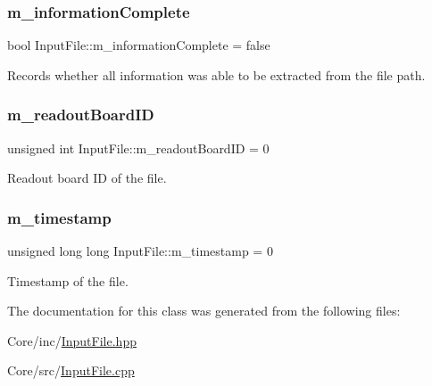 \subsubsection{\texorpdfstring{m\+\_\+information\+Complete}{m\_informationComplete}}
{\footnotesize\ttfamily bool Input\+File\+::m\+\_\+information\+Complete = false\hspace{0.3cm}{\ttfamily [private]}}



Records whether all information was able to be extracted from the file path. 

\mbox{\label{class_input_file_a15431dd487c5ac563745856544c9261d}} 
\subsubsection{\texorpdfstring{m\+\_\+readout\+Board\+ID}{m\_readoutBoardID}}
{\footnotesize\ttfamily unsigned int Input\+File\+::m\+\_\+readout\+Board\+ID = 0\hspace{0.3cm}{\ttfamily [private]}}



Readout board ID of the file. 

\mbox{\label{class_input_file_a900aea752727f969fa00a8b2727dd4e8}} 
\subsubsection{\texorpdfstring{m\+\_\+timestamp}{m\_timestamp}}
{\footnotesize\ttfamily unsigned long long Input\+File\+::m\+\_\+timestamp = 0\hspace{0.3cm}{\ttfamily [private]}}



Timestamp of the file. 



The documentation for this class was generated from the following files\+:\begin{DoxyCompactItemize}
\item 
Core/inc/\hyperlink{_input_file_8hpp}{Input\+File.\+hpp}\item 
Core/src/\hyperlink{_input_file_8cpp}{Input\+File.\+cpp}\end{DoxyCompactItemize}

